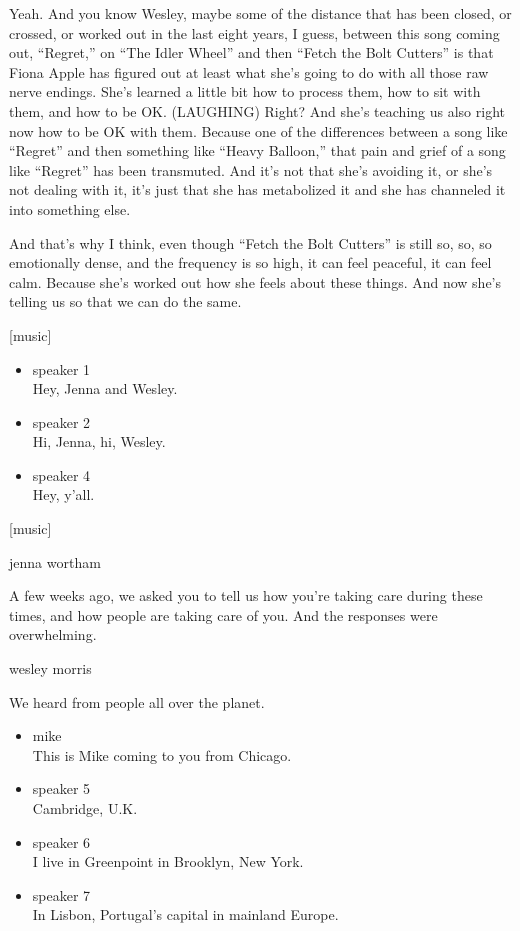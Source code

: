 Yeah. And you know Wesley, maybe some of the distance that has been
closed, or crossed, or worked out in the last eight years, I guess,
between this song coming out, ``Regret,'' on ``The Idler Wheel'' and
then ``Fetch the Bolt Cutters'' is that Fiona Apple has figured out at
least what she's going to do with all those raw nerve endings. She's
learned a little bit how to process them, how to sit with them, and how
to be OK. (LAUGHING) Right? And she's teaching us also right now how to
be OK with them. Because one of the differences between a song like
``Regret'' and then something like ``Heavy Balloon,'' that pain and
grief of a song like ``Regret'' has been transmuted. And it's not that
she's avoiding it, or she's not dealing with it, it's just that she has
metabolized it and she has channeled it into something else.

And that's why I think, even though ``Fetch the Bolt Cutters'' is still
so, so, so emotionally dense, and the frequency is so high, it can feel
peaceful, it can feel calm. Because she's worked out how she feels about
these things. And now she's telling us so that we can do the same.

{[}music{]}

\begin{itemize}
\item
  speaker 1\\
  Hey, Jenna and Wesley.
\item
  speaker 2\\
  Hi, Jenna, hi, Wesley.
\item
  speaker 4\\
  Hey, y'all.
\end{itemize}

{[}music{]}

jenna wortham

A few weeks ago, we asked you to tell us how you're taking care during
these times, and how people are taking care of you. And the responses
were overwhelming.

wesley morris

We heard from people all over the planet.

\begin{itemize}
\item
  mike\\
  This is Mike coming to you from Chicago.
\item
  speaker 5\\
  Cambridge, U.K.
\item
  speaker 6\\
  I live in Greenpoint in Brooklyn, New York.
\item
  speaker 7\\
  In Lisbon, Portugal's capital in mainland Europe.
\end{itemize}

